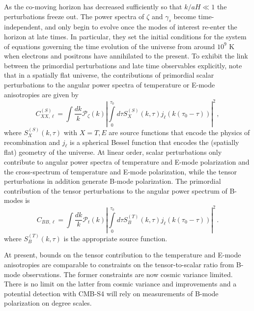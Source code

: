 As the co-moving horizon has decreased sufficiently so that $k/aH\ll 1$ the perturbations freeze out. The power spectra of $\zeta$ and $\gamma_s$ become time-independent, and only begin to evolve once the modes of interest re-enter the horizon at late times. In particular, they set the initial conditions for the system of equations governing the time evolution of the universe from around $10^9$ K when electrons and positrons have annihilated to the present. To exhibit the link between the primordial perturbations and late time observables explicitly, note that in a spatially flat universe, the contributions of primordial scalar perturbations to the angular power spectra of temperature or E-mode anisotropies are given by
\begin{equation}
C^{(S)}_{XX,\ell}=\int \frac{dk}{k}\mathcal{P}_\zeta(k)\left|\int\limits_0^{\tau_0} d\tau S_X^{(S)}(k,\tau)j_\ell(k(\tau_0-\tau))\right|^2\,,
\end{equation}
where $S_X^{(S)}(k,\tau)$ with $X=T,E$ are source functions that encode the physics of recombination and $j_\ell$ is a spherical Bessel function that encodes the (spatially flat) geometry of the universe.
At linear order, scalar perturbations only contribute to angular power spectra of temperature and E-mode polarization and the cross-spectrum of temperature and E-mode polarization, while the tensor perturbations in addition generate B-mode polarization. The primordial contribution of the tensor perturbations to the angular power spectrum of B-modes is 
\begin{equation}
C_{BB,\ell}=\int \frac{dk}{k}\mathcal{P}_t(k)\left|\int\limits_0^{\tau_0} d\tau S_B^{(T)}(k,\tau)j_\ell(k(\tau_0-\tau))\right|^2\,.
\end{equation}
where $S_B^{(T)}(k,\tau)$ is the appropriate source function. 

At present, bounds on the tensor contribution to the temperature and E-mode anisotropies are comparable to constraints on the tensor-to-scalar ratio from B-mode observations. The former constraints are now cosmic variance limited. There is no limit on the latter from cosmic variance and improvements and a potential detection with CMB-S4 will rely on measurements of B-mode polarization on degree scales.

